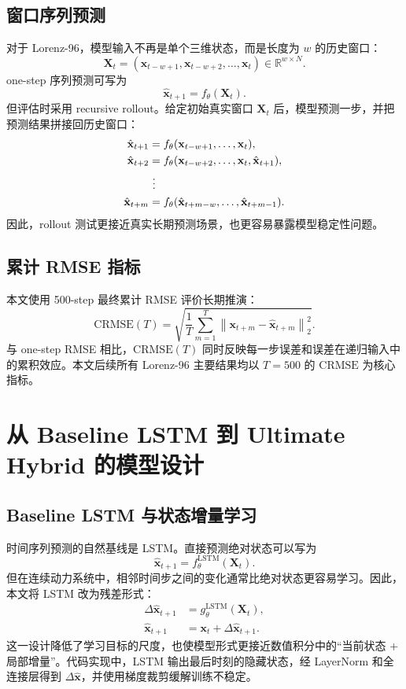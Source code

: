 \documentclass[UTF8,a4paper,12pt]{ctexart}
\newcommand{\xvec}{\mathbf{x}}
\newcommand{\crmse}{\mathrm{CRMSE}}
\begin{document}
\subsection{窗口序列预测}

对于 Lorenz-96，模型输入不再是单个三维状态，而是长度为 $w$ 的历史窗口：
\begin{equation}
\mathbf{X}_t=(\xvec_{t-w+1},\xvec_{t-w+2},\dots,\xvec_t)\in \mathbb{R}^{w\times N}.
\end{equation}
one-step 序列预测可写为
\begin{equation}
\hat{\xvec}_{t+1}=f_\theta(\mathbf{X}_t).
\end{equation}
但评估时采用 recursive rollout。给定初始真实窗口 $\mathbf{X}_t$ 后，模型预测一步，并把预测结果拼接回历史窗口：
\begin{align}
\hat{\xvec}_{t+1} &= f_\theta(\xvec_{t-w+1},\dots,\xvec_t),\\
\hat{\xvec}_{t+2} &= f_\theta(\xvec_{t-w+2},\dots,\xvec_t,\hat{\xvec}_{t+1}),\\
&\ \vdots \notag\\
\hat{\xvec}_{t+m} &= f_\theta(\hat{\xvec}_{t+m-w},\dots,\hat{\xvec}_{t+m-1}).
\end{align}
因此，rollout 测试更接近真实长期预测场景，也更容易暴露模型稳定性问题。

\subsection{累计 RMSE 指标}

本文使用 500-step 最终累计 RMSE 评价长期推演：
\begin{equation}
\crmse(T)=
\sqrt{
\frac{1}{T}\sum_{m=1}^{T}
\left\|\xvec_{t+m}-\hat{\xvec}_{t+m}\right\|_2^2
}.
\end{equation}
与 one-step RMSE 相比，$\crmse(T)$ 同时反映每一步误差和误差在递归输入中的累积效应。本文后续所有 Lorenz-96 主要结果均以 $T=500$ 的 $\crmse$ 为核心指标。

\section{从 Baseline LSTM 到 Ultimate Hybrid 的模型设计}

\subsection{Baseline LSTM 与状态增量学习}

时间序列预测的自然基线是 LSTM。直接预测绝对状态可以写为
\begin{equation}
\hat{\xvec}_{t+1}=f_{\theta}^{\mathrm{LSTM}}(\mathbf{X}_t).
\end{equation}
但在连续动力系统中，相邻时间步之间的变化通常比绝对状态更容易学习。因此，本文将 LSTM 改为残差形式：
\begin{align}
\Delta \hat{\xvec}_{t+1} &= g_{\theta}^{\mathrm{LSTM}}(\mathbf{X}_t),\\
\hat{\xvec}_{t+1} &= \xvec_t+\Delta \hat{\xvec}_{t+1}.
\end{align}
这一设计降低了学习目标的尺度，也使模型形式更接近数值积分中的“当前状态 + 局部增量”。代码实现中，LSTM 输出最后时刻的隐藏状态，经 LayerNorm 和全连接层得到 $\Delta \hat{\xvec}$，并使用梯度裁剪缓解训练不稳定。
\end{document}
